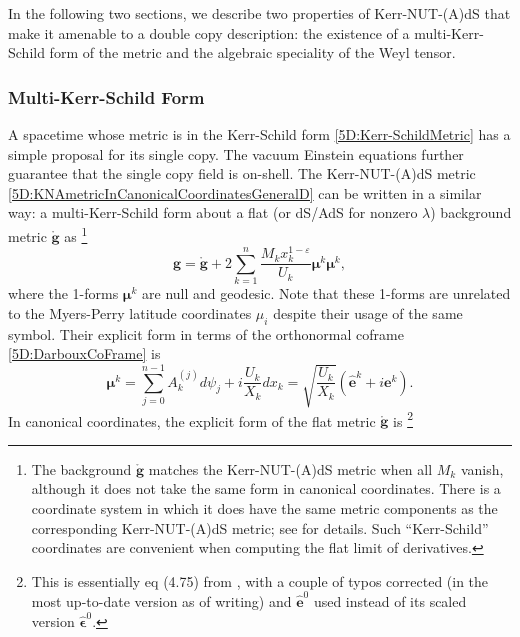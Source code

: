 In the following two sections, we describe two properties of Kerr-NUT-(A)dS that make it amenable to a double copy
description: the existence of a multi-Kerr-Schild form of the metric and the algebraic speciality of the Weyl
tensor.

\subsubsection{Multi-Kerr-Schild Form} \label{5D:sec:MultiKerrSchild} 

A spacetime whose metric is in the Kerr-Schild form \eqref{5D:Kerr-SchildMetric} has a simple proposal for its
single copy. The vacuum Einstein equations further guarantee that the single copy field is on-shell.
%
The Kerr-NUT-(A)dS metric \eqref{5D:KNAmetricInCanonicalCoordinatesGeneralD} can be written in a similar way: a multi-Kerr-Schild
form about a flat (or dS/AdS for nonzero $\lambda$) background metric
$\mathring{\mathbf{g}}$ as%
%
\footnote{The background $\mathbf{\mathring{g}}$ matches
the Kerr-NUT-(A)dS metric when all $M_{k}$ vanish, although it does not take the same form in canonical coordinates.
There is a coordinate system in which it does have the same metric components as the corresponding Kerr-NUT-(A)dS
metric; see \cite{Frolov:2017kze} for details. Such ``Kerr-Schild'' coordinates are convenient when computing the
flat limit of derivatives.}
%
\begin{equation} \label{5D:MultiKerrSchildMetric} 
    \mathbf{g} = \mathring{\mathbf{g}} + 2 \sum_{k = 1}^{n} \frac{M_{k}x_{k}^{1-\varepsilon}}{U_{k}}
    \boldsymbol{\mu}^{k} \boldsymbol{\mu}^{k},
\end{equation}
%
where the 1-forms $ \boldsymbol{\mu}^{k}$ are null and geodesic. Note that these 1-forms are unrelated to the
Myers-Perry latitude coordinates $\mu_{i}$ despite their usage of the same symbol. Their explicit form in terms of the orthonormal coframe \eqref{5D:DarbouxCoFrame}
is
%
\begin{equation} \label{5D:MuDefn} 
        \boldsymbol{\mu}^{k} = \sum_{j = 0}^{n - 1} A_{k}^{(j)} d\psi_{j} + i \frac{U_{k}}{X_{k}} dx_{k} = \sqrt{
        \frac{U_{k}}{X_{k}}} \left(\mathbf{\hat{e}}^{k} + i \mathbf{e}^{k}\right).
\end{equation}
% 
%
In canonical coordinates, the explicit form of the flat metric $\mathring{\mathbf{g}}$ is%
\footnote{This is essentially eq (4.75) from \cite{Frolov:2017kze}, with a couple of typos corrected (in the most
up-to-date version as of writing) and $\mathbf{\hat{e}}^{0}$ used instead of its scaled version
$\mathbf{\hat{\epsilon}}^{0}$.}
